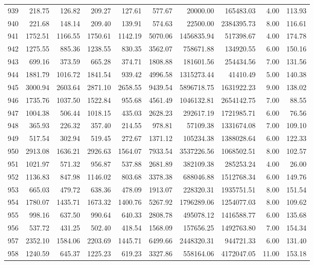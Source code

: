 \begin{tabular}{lrrrrrrrrr}
939 & 218.75 & 126.82 & 209.27 & 127.61 & 577.67 & 20000.00 & 165483.03 & 4.00 & 113.93 \\
940 & 221.68 & 148.14 & 209.40 & 139.91 & 574.63 & 22500.00 & 2384395.73 & 8.00 & 116.61 \\
941 & 1752.51 & 1166.55 & 1750.61 & 1142.19 & 5070.06 & 1456835.94 & 517398.67 & 4.00 & 174.78 \\
942 & 1275.55 & 885.36 & 1238.55 & 830.35 & 3562.07 & 758671.88 & 134920.55 & 6.00 & 150.16 \\
943 & 699.16 & 373.59 & 665.28 & 374.71 & 1808.88 & 181601.56 & 254434.56 & 7.00 & 131.56 \\
944 & 1881.79 & 1016.72 & 1841.54 & 939.42 & 4996.58 & 1315273.44 & 41410.49 & 5.00 & 140.38 \\
945 & 3000.94 & 2603.64 & 2871.10 & 2658.55 & 9439.54 & 5896718.75 & 1631922.23 & 9.00 & 138.02 \\
946 & 1735.76 & 1037.50 & 1522.84 & 955.68 & 4561.49 & 1046132.81 & 2654142.75 & 7.00 & 88.55 \\
947 & 1004.38 & 506.44 & 1018.15 & 435.03 & 2628.23 & 292617.19 & 1721985.71 & 6.00 & 76.56 \\
948 & 365.93 & 226.32 & 357.40 & 214.55 & 978.81 & 57109.38 & 1331674.08 & 7.00 & 109.10 \\
949 & 517.54 & 302.94 & 519.45 & 272.67 & 1371.12 & 105234.38 & 1388028.64 & 6.00 & 122.33 \\
950 & 2913.08 & 1636.21 & 2926.63 & 1564.07 & 7933.54 & 3537226.56 & 1068502.51 & 8.00 & 102.57 \\
951 & 1021.97 & 571.32 & 956.87 & 537.88 & 2681.89 & 382109.38 & 285253.24 & 4.00 & 26.00 \\
952 & 1136.83 & 847.98 & 1146.02 & 803.68 & 3378.38 & 688046.88 & 1512768.34 & 6.00 & 149.76 \\
953 & 665.03 & 479.72 & 638.36 & 478.09 & 1913.07 & 228320.31 & 1935751.51 & 8.00 & 151.54 \\
954 & 1780.07 & 1435.71 & 1673.32 & 1400.76 & 5267.92 & 1796289.06 & 1254077.03 & 8.00 & 109.62 \\
955 & 998.16 & 637.50 & 990.64 & 640.33 & 2808.78 & 495078.12 & 1416588.77 & 6.00 & 135.68 \\
956 & 537.72 & 431.25 & 502.40 & 418.54 & 1568.09 & 157656.25 & 1492763.80 & 7.00 & 154.34 \\
957 & 2352.10 & 1584.06 & 2203.69 & 1445.71 & 6499.66 & 2448320.31 & 944721.33 & 6.00 & 131.40 \\
958 & 1240.59 & 645.37 & 1225.23 & 619.23 & 3327.86 & 558164.06 & 4172047.05 & 11.00 & 153.18 \\

\end{tabular}
